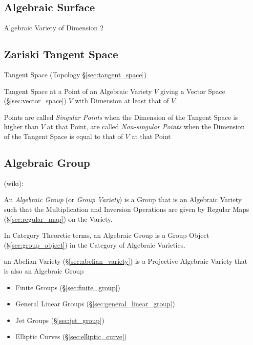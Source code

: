 \subsection{Algebraic Surface}\label{sec:algebraic_surface}

Algebraic Variety of Dimension 2



\subsection{Zariski Tangent Space}\label{sec:zariski_space}

Tangent Space (Topology \S\ref{sec:tangent_space})

Tangent Space at a Point of an Algebraic Variety $V$ giving a Vector Space
(\S\ref{sec:vector_space}) $V$ with Dimension at least that of $V$

Points are called \emph{Singular Points} when the Dimension of the Tangent
Space is higher than $V$ at that Point, are called \emph{Non-singular Points}
when the Dimension of the Tangent Space is equal to that of $V$ at that Point



\subsection{Algebraic Group}\label{sec:algebraic_group}

(wiki):

An \emph{Algebraic Group} (or \emph{Group Variety}) is a Group that is an
Algebraic Variety such that the Multiplication and Inversion Operations are
given by Regular Maps (\S\ref{sec:regular_map}) on the Variety.

In Category Theoretic terms, an Algebraic Group is a Group Object
(\S\ref{sec:group_object}) in the Category of Algebraic Varieties.

\fist an Abelian Variety (\S\ref{sec:abelian_variety}) is a Projective Algebraic
Variety that is also an Algebraic Group

\begin{itemize}
  \item Finite Groups (\S\ref{sec:finite_group})
  \item General Linear Groups (\S\ref{sec:general_linear_group})
  \item Jet Groups (\S\ref{sec:jet_group})
  \item Elliptic Curves (\S\ref{sec:elliptic_curve})
\end{itemize}




